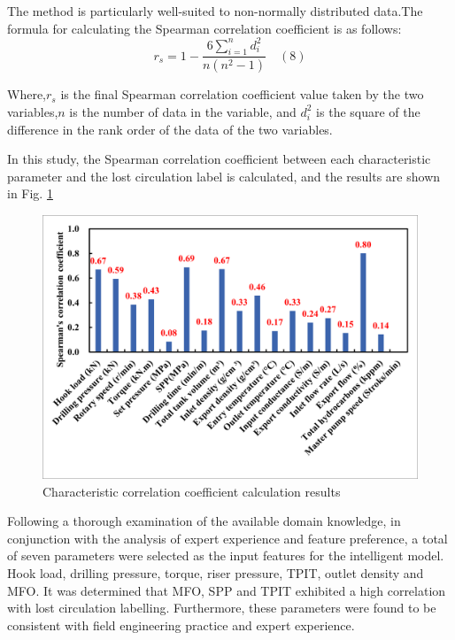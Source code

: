 \documentclass[journal,article,submit,pdftex,moreauthors]{Definitions/mdpi}
\begin{document}
The method is particularly well-suited to non-normally distributed data.The formula for calculating the Spearman correlation coefficient is as follows:
\[{{r}_{s}}=1-\frac{6\sum\limits_{i=1}^{n}{d_{i}^{2}}}{n\left( {{n}^{2}}-1 \right)}\quad (8)\]

Where,\({{r}_{s}}\) is the final Spearman correlation coefficient value taken by the two variables,\(n\) is the number of data in the variable, and  \(d_{i}^{2}\) is the square of the difference in the rank order of the data of the two variables.


In this study, the Spearman correlation coefficient between each characteristic parameter and the lost circulation label is calculated, and the results are shown in Fig.  \ref{fig:Characteristic correlation coefficient calculation results}

\begin{figure}[H]
    \centering
    \includegraphics[width=0.75\linewidth]{图片/spearman.png}
    \caption{Characteristic correlation coefficient calculation results}
    \label{fig:Characteristic correlation coefficient calculation results}
\end{figure}

Following a thorough examination of the available domain knowledge, in conjunction with the analysis of expert experience and feature preference, a total of seven parameters were selected as the input features for the intelligent model. Hook load, drilling pressure, torque, riser pressure, TPIT, outlet density and MFO. It was determined that MFO, SPP and TPIT exhibited a high correlation with lost circulation labelling. Furthermore, these parameters were found to be consistent with field engineering practice and expert experience.

\end{document}
